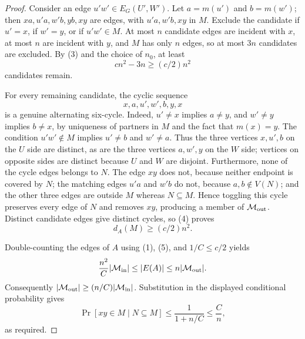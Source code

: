 \begin{proof}
Consider an edge $u'w'\in E_G(U',W')$.  Let $a=m(u')$ and $b=m(w')$;
then $xa,u'a,w'b,yb,xy$ are edges, with $u'a,w'b,xy$ in $M$.  Exclude the
candidate if $u'=x$, if $w'=y$, or if $u'w'\in M$.  At most $n$ candidate
edges are incident with $x$, at most $n$ are incident with $y$, and $M$ has
only $n$ edges, so at most $3n$ candidates are excluded.  By (3) and the
choice of $n_0$, at least
\[
 cn^2-3n\geq(c/2)n^2 \tag{4}
\]
candidates remain.

For every remaining candidate, the cyclic sequence
\[
 x,a,u',w',b,y,x
\]
is a genuine alternating six-cycle.  Indeed, $u'\ne x$ implies $a\ne y$,
and $w'\ne y$ implies $b\ne x$, by uniqueness of partners in $M$ and the
fact that $m(x)=y$.  The condition $u'w'\notin M$ implies
$u'\ne b$ and $w'\ne a$.  Thus the three vertices $x,u',b$ on the $U$ side
are distinct, as are the three vertices $a,w',y$ on the $W$ side; vertices
on opposite sides are distinct because $U$ and $W$ are disjoint.
Furthermore, none of the cycle edges belongs to $N$.  The edge $xy$ does not,
because neither endpoint is covered by $N$; the matching edges $u'a$ and
$w'b$ do not, because $a,b\notin V(N)$; and the other three edges are outside
$M$ whereas $N\subseteq M$.  Hence toggling this cycle preserves every edge
of $N$ and removes $xy$, producing a member of $\mathcal M_{\rm out}$.
Distinct candidate edges give distinct cycles, so (4) proves
\[
 d_A(M)\geq(c/2)n^2. \tag{5}
\]

Double-counting the edges of $A$ using (1), (5), and $1/C\leq c/2$ yields
\[
 \frac{n^2}{C}|\mathcal M_{\rm in}|
 \leq |E(A)|\leq n|\mathcal M_{\rm out}|.
\]
Consequently $|\mathcal M_{\rm out}|\geq
(n/C)|\mathcal M_{\rm in}|$.  Substitution in the displayed conditional
probability gives
\[
 \Pr[xy\in M\mid N\subseteq M]
 \leq\frac{1}{1+n/C}\leq\frac Cn,
\]
as required.
\end{proof}
